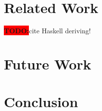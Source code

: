 \documentclass[preprint,10pt]{sigplanconf}
\theoremstyle{definition}
\newcommand{\todo}{{\bf \colorbox{red}{\color{white}TODO:}}}
\begin{document}
\section{Related Work}

\todo cite Haskell deriving!

\section{Future Work}

\section{Conclusion}













\end{document}
